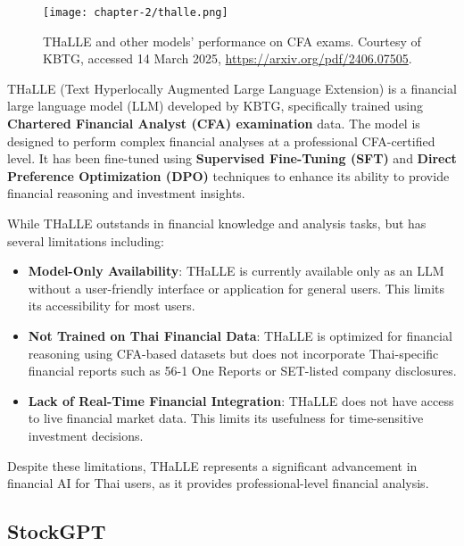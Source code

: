 \begin{figure}[h]
    \centering
    \texttt{[image: chapter-2/thalle.png]}
    \caption[THaLLE and other models' performance on CFA exams]{THaLLE and other models' performance on CFA exams. Courtesy of KBTG, accessed 14 March 2025, \url{https://arxiv.org/pdf/2406.07505}.}
    \label{fig:thalle}
\end{figure}

\FloatBarrier

THaLLE (Text Hyperlocally Augmented Large Language Extension) is a financial large language model (LLM) developed by KBTG, specifically trained using \textbf{Chartered Financial Analyst (CFA) examination} data.
The model is designed to perform complex financial analyses at a professional CFA-certified level.
It has been fine-tuned using \textbf{Supervised Fine-Tuning (SFT)} and \textbf{Direct Preference Optimization (DPO)} techniques to enhance its ability to provide financial reasoning and investment insights.

While THaLLE outstands in financial knowledge and analysis tasks, but has several limitations including:

\begin{itemize}[leftmargin=60pt]
    \item \textbf{Model-Only Availability}: THaLLE is currently available only as an LLM without a user-friendly interface or application for general users. This limits its accessibility for most users.
    \item \textbf{Not Trained on Thai Financial Data}: THaLLE is optimized for financial reasoning using CFA-based datasets but does not incorporate Thai-specific financial reports such as 56-1 One Reports or SET-listed company disclosures.
    \item \textbf{Lack of Real-Time Financial Integration}: THaLLE does not have access to live financial market data. This limits its usefulness for time-sensitive investment decisions.
\end{itemize}

Despite these limitations, THaLLE represents a significant advancement in financial AI for Thai users, as it provides professional-level financial analysis\cite{THaLLEarXiv}.

\newpage

\subsection{StockGPT}
\label{subsection:stockgpt}

